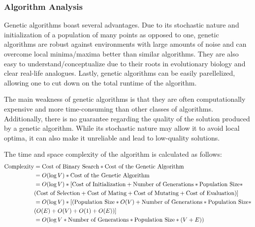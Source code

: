 \documentclass[acmlarge]{acmart}
\begin{document}
\subsubsection{Algorithm Analysis}
Genetic algorithms boast several advantages. Due to its stochastic nature and initialization of a population of many points as opposed to one, genetic algorithms are robust against environments with large amounts of noise and can overcome local minima/maxima better than similar algorithms. They are also easy to understand/conceptualize due to their roots in evolutionary biology and clear real-life analogues. Lastly, genetic algorithms can be easily parellelized, allowing one to cut down on the total runtime of the algorithm.

The main weakness of genetic algorithms is that they are often computationally expensive and more time-consuming than other classes of algorithms. Additionally, there is no guarantee regarding the quality of the solution produced by a genetic algorithm. While its stochastic nature may allow it to avoid local optima, it can also make it unreliable and lead to low-quality solutions.

The time and space complexity of the algorithm is calculated as follows:
\vspace{-.5cm}
\begin{align*}
    \textnormal{Complexity} &= \textnormal{Cost of Binary Search} * \textnormal{Cost of the Genetic Algorithm}\\
    &= O(\log V) * \textnormal{Cost of the Genetic Algorithm}\\
    &= O(\log V) * [\textnormal{Cost of Initialization} + \textnormal{Number of Generations} * \textnormal{Population Size} * \\
    &(\textnormal{Cost of Selection} + \textnormal{Cost of Mating} + \textnormal{Cost of Mutating} + \textnormal{Cost of Evaluation})]\\
    &= O(\log V) * [(\textnormal{Population Size} * O(V) + \textnormal{Number of Generations} * \textnormal{Population Size} * \\
    &(O(E) + O(V) + O(1) + O(E))]\\
    &= O(\log V * \textnormal{Number of Generations} * \textnormal{Population Size} * (V + E))\\
\end{align*}
\end{document}
